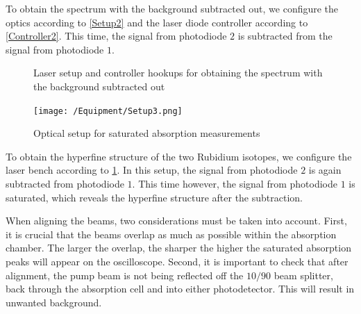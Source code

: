 \documentclass[12pt]{article}
\begin{document}
	To obtain the spectrum with the background subtracted out, we configure the optics according to \cref{Setup2} and the laser diode controller according to \cref{Controller2}. This time, the signal from photodiode $2$ is subtracted from the signal from photodiode $1$.
	
	\begin{figure}[H]
		\centering
		\qquad
		\caption{Laser setup and controller hookups for obtaining the spectrum with the background subtracted out}
	\end{figure}

	
	
	\begin{figure}
		\texttt{[image: /Equipment/Setup3.png]}
		\caption{Optical setup for saturated absorption measurements}
		\label{Setup3}
	\end{figure}
	
	
	
	
	To obtain the hyperfine structure of the two Rubidium isotopes, we configure the laser bench according to \cref{Setup3}. In this setup, the signal from photodiode $2$ is again subtracted from photodiode $1$. This time however, the signal from photodiode $1$ is saturated, which reveals the hyperfine structure after the subtraction.
	
	When aligning the beams, two considerations must be taken into account. First, it is crucial that the beams overlap as much as possible within the absorption chamber. The larger the overlap, the sharper the higher the saturated absorption peaks will appear on the oscilloscope. Second, it is important to check that after alignment, the pump beam is not being reflected off the $10/90$ beam splitter, back through the absorption cell and into either photodetector. This will result in unwanted background.
	
\end{document}

